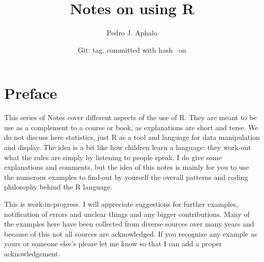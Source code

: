 \documentclass[paper=a4,10pt,div=17,headsepline,BCOR=12mm,twoside,open=right]{scrbook}\usepackage{knitr}
\title{Notes on using R}
\author{Pedro J. Aphalo}
\date{Git: tag\gitVtagn , committed with hash \gitAbbrevHash\ on \gitAuthorIsoDate}
\begin{document}











\maketitle


\tableofcontents




\chapter*{Preface}

This series of Notes cover different aspects of the use of R. They are meant to be use as a complement to a course or book, as explanations
are short and terse. We do not discuss here statistics, just R as a tool and language for data manipulation and display. The idea is a bit like how children learn a language: they work-out what the rules are simply by listening to people speak. I do give some explanations and comments, but the idea of this notes is mainly for you to use the numerous examples to find-out by yourself the overall patterns and coding philosophy behind the R language.

This is work-in-progress. I will appreciate suggestions for further examples, notification of errors and unclear things and any bigger contributions. Many of the examples here have been collected from diverse sources over many years and because of this not all sources are acknowledged. If you recognize any example as yours or someone else's please let me know so that I can add a proper acknowledgement.








\end{document}
